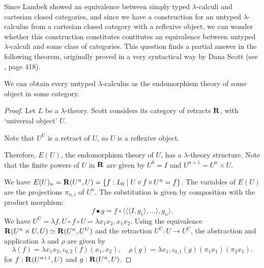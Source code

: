 Since Lambek showed an equivalence between simply typed $ \lambda $-calculi and cartesian closed categories, and since we have a construction for an untyped $ \lambda $-calculus from a cartesian closed category with a reflexive object, we can wonder whether this construction constitutes contitutes an equivalence between untyped $ \lambda $-calculi and some class of categories. This question finds a partial answer in the following theorem, originally proved in a very syntactical way by Dana Scott (see \autocite{curry}, page 418).
\begin{theorem}\label{thm:Scott}
  We can obtain every untyped $ \lambda $-calculus as the endomorphism theory of some object in some category.
\end{theorem}
\begin{proof}
  Let $ L $ be a $ \lambda $-theory. Scott considers its category of retracts $ \mathbf{R} $, with `universal object' $ U $.

  Note that $ U^U $ is a retract of $ U $, so $ U $ is a reflexive object.

  Therefore, $ E(U) $, the endomorphism theory of $ U $, has a $ \lambda $-theory structure. Note that the finite powers of $ U $ in $ \mathbf{R} $ are given by $ U^0 = I $ and $ U^{n + 1} = U^n \times U $.

  We have $ E(U)_n = \mathbf{R}(U^n, U) = \{ f: L_0 \mid U \circ f \circ U^n = f \} $. The variables of $ E(U) $ are the projections $ \pi_{n, i} $ of $ U^n $. The substitution is given by composition with the product morphism:
  \[ f \bullet g = f \circ \langle \langle \langle I, g_1 \rangle, \dots \rangle, g_n \rangle. \]
  We have $ U^U = \lambda f, U \circ f \circ U = \lambda x_1 x_2, x_1 x_2 $. Using the equivalence $ \mathbf{R}(U^n \times U, U) \simeq \mathbf{R}(U^n, U^U) $ and the retraction $ U^U: U \to U^U $, the abstraction and application $ \lambda $ and $ \rho $ are given by
  \[ \lambda(f) = \lambda x_1 x_2, \iota_{0, 2}(f)(x_1, x_2), \quad \rho(g) = \lambda x_1, \iota_{0, 1}(g) (\pi_1 x_1) (\pi_2 x_1). \]
  for $ f: \mathbf{R}(U^{n + 1}, U) $ and $ g: \mathbf{R}(U^n, U) $.


\end{proof}
